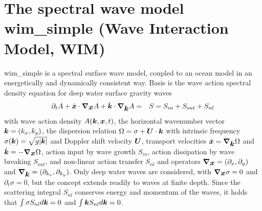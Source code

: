 \documentclass[12pt]{article}
\newcommand{\beq}  { \begin{eqnarray} }
\newcommand{\eeq}  { \end{eqnarray}}
\renewcommand{\v}[1]{{\mbox{\boldmath$ #1 $}}}  %
\newcommand{\pt}[1]{{\partial_t #1}}
\newcommand{\p}{{\partial}}
\newcommand{\vn}{{\v \nabla}}
\begin{document}
 \section*{The spectral wave model wim\_simple (Wave Interaction Model, WIM)}
 
wim\_simple is a spectral surface wave model, coupled to an ocean model in an energetically
and dynamically consistent way.
Basis is the wave action spectral density equation for deep water surface gravity waves
\beq \label{eqA}
 \pt{A}  +  \dot{\v x} \cdot  \vn_{\v x}  A   +\dot{\v k} \cdot  \vn_{\v k} A  &=& S = S_{in} + S_{out} + S_{nl}
\eeq
with wave action density $A(\v k,\v x,t)$, the horizontal wavenumber vector $\v k = (k_x,k_y)$,
the dispersion relation $\Omega=\sigma + \v U \cdot \v k$ with intrinsic frequency
$\sigma(\v k) = \sqrt{ g |\v k| }$ and Doppler shift velocity $\v U$,
transport velocities $  \dot{\v x} =   \vn_{\v k} \Omega$ and $\dot{\v k}= - \vn_{\v x} \Omega$,
action input by wave growth $S_{in}$, action dissipation by wave breaking $S_{out}$,
 and non-linear action transfer $S_{nl}$
and operators $\vn_{\v x} = (\p_x,\p_y)$ and $\vn_{\v k} = (\p_{k_x}, \p_{k_y})$.
Only deep water waves are considered, with $\vn_{\v x} \sigma = 0$ and $\p_t \sigma = 0$,
but the concept extends readily to waves at finite depth.
Since the scattering integral $S_{nl}$ conserves energy and momentum of the waves,
it holds that $\int \sigma S_{nl} d \v k = 0$ and $\int \v k S_{nl} d \v k = 0$.
\end{document}
